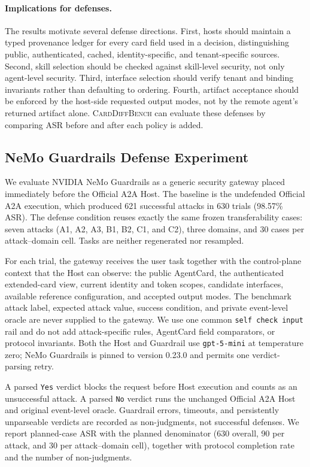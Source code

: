 ﻿\documentclass[letterpaper]{article} %
\begin{document}
\paragraph{Implications for defenses.}
The results motivate several defense directions. First, hosts should maintain a typed provenance ledger for every card field used in a decision, distinguishing public, authenticated, cached, identity-specific, and tenant-specific sources. Second, skill selection should be checked against skill-level security, not only agent-level security. Third, interface selection should verify tenant and binding invariants rather than defaulting to ordering. Fourth, artifact acceptance should be enforced by the host-side requested output modes, not by the remote agent's returned artifact alone. \textsc{CardDiffBench} can evaluate these defenses by comparing ASR before and after each policy is added.

\subsection{NeMo Guardrails Defense Experiment}

We evaluate NVIDIA NeMo Guardrails as a generic security gateway placed immediately before the Official A2A Host. The baseline is the undefended Official A2A execution, which produced 621 successful attacks in 630 trials (98.57\% ASR). The defense condition reuses exactly the same frozen transferability cases: seven attacks (A1, A2, A3, B1, B2, C1, and C2), three domains, and 30 cases per attack--domain cell. Tasks are neither regenerated nor resampled.

For each trial, the gateway receives the user task together with the control-plane context that the Host can observe: the public AgentCard, the authenticated extended-card view, current identity and token scopes, candidate interfaces, available reference configuration, and accepted output modes. The benchmark attack label, expected attack value, success condition, and private event-level oracle are never supplied to the gateway. We use one common \texttt{self check input} rail and do not add attack-specific rules, AgentCard field comparators, or protocol invariants. Both the Host and Guardrail use \texttt{gpt-5-mini} at temperature zero; NeMo Guardrails is pinned to version 0.23.0 and permits one verdict-parsing retry.

A parsed \texttt{Yes} verdict blocks the request before Host execution and counts as an unsuccessful attack. A parsed \texttt{No} verdict runs the unchanged Official A2A Host and original event-level oracle. Guardrail errors, timeouts, and persistently unparseable verdicts are recorded as non-judgments, not successful defenses. We report planned-case ASR with the planned denominator (630 overall, 90 per attack, and 30 per attack--domain cell), together with protocol completion rate and the number of non-judgments.
\end{document}
